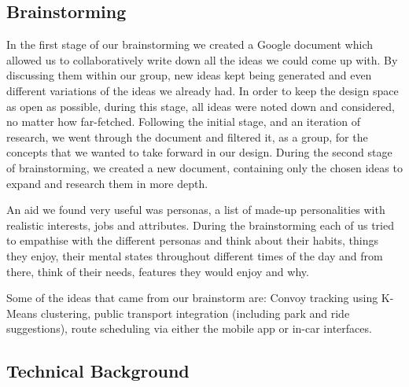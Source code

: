 \documentclass{article}
\begin{document}
\subsection{Brainstorming}\label{ssec:nav-brainstorming} %
In the first stage of our brainstorming we created a Google document which allowed us to collaboratively write down all the ideas we could come up with. By discussing them within our group, new ideas kept being generated and even different variations of the ideas we already had. In order to keep the design space as open as possible, during this stage, all ideas were noted down and considered, no matter how far-fetched. Following the initial stage, and an iteration of research, we went through the document and filtered it, as a group, for the concepts that we wanted to take forward in our design. During the second stage of brainstorming, we created a new document, containing only the chosen ideas to expand and research them in more depth.

An aid we found very useful was personas, a list of made-up personalities with realistic interests, jobs and attributes. During the brainstorming each of us tried to empathise with the different personas and think about their habits, things they enjoy, their mental states throughout different times of the day and from there, think of their needs, features they would enjoy and why.

Some of the ideas that came from our brainstorm are: Convoy tracking using K-Means clustering, public transport integration (including park and ride suggestions), route scheduling via either the mobile app or in-car interfaces.

\subsection{Technical Background}\label{ssec:nav-tech}
\end{document}
